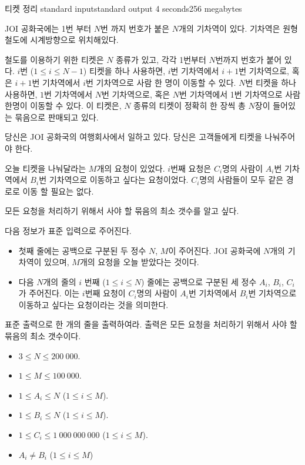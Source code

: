 \begin{problem}{티켓 정리}
	{standard input}{standard output}
	{4 seconds}{256 megabytes}{}
	
	JOI 공화국에는 1번 부터 $N$번 까지 번호가 붙은 $N$개의 기차역이 있다. 기차역은 원형 철도에 시계방향으로 위치해있다.
	
	철도를 이용하기 위한 티켓은 $N$ 종류가 있고, 각각 1번부터 $N$번까지 번호가 붙어 있다. $i$번 ($1 \le i \le N-1$) 티켓을 하나 사용하면, $i$번 기차역에서 $i+1$번 기차역으로, 혹은 $i+1$번 기차역에서 $i$번 기차역으로 사람 한 명이 이동할 수 있다. $N$번 티켓을 하나 사용하면, $1$번 기차역에서 $N$번 기차역으로, 혹은 $N$번 기차역에서 1번 기차역으로 사람 한명이 이동할 수 있다. 이 티켓은, $N$ 종류의 티켓이 정확히 한 장씩 총 $N$장이 들어있는 묶음으로 판매되고 있다.
	
	당신은 JOI 공화국의 여행회사에서 일하고 있다. 당신은 고객들에게 티켓을 나눠주어야 한다.
	
	오늘 티켓을 나눠달라는 $M$개의 요청이 있었다. $i$번째 요청은 $C_i$명의 사람이 $A_i$번 기차역에서 $B_i$번 기차역으로 이동하고 싶다는 요청이었다. $C_i$명의 사람들이 모두 같은 경로로 이동 할 필요는 없다.
	
	모든 요청을 처리하기 위해서 사야 할 묶음의 최소 갯수를 알고 싶다.

	\InputFile
	
	다음 정보가 표준 입력으로 주어진다.
	
	\begin{itemize}
		\item 첫째 줄에는 공백으로 구분된 두 정수 $N$, $M$이 주어진다. JOI 공화국에 $N$개의 기차역이 있으며, $M$개의 요청을 오늘 받았다는 것이다.
		\item 다음 $N$개의 줄의 $i$ 번째 ($1 \le i \le N$) 줄에는 공백으로 구분된 세 정수 $A_i$, $B_i$, $C_i$가 주어진다. 이는 $i$번째 요청이 $C_i$명의 사람이 $A_i$번 기차역에서 $B_i$번 기차역으로 이동하고 싶다는 요청이라는 것을 의미한다.
	\end{itemize}

	
	\OutputFile
	
	표준 출력으로 한 개의 줄을 출력하여라. 출력은 모든 요청을 처리하기 위해서 사야 할 묶음의 최소 갯수이다.
	
	\Constraints
	
	\begin{itemize}
	
	\item $3 \le N \le 200\ 000$.
	\item $1 \le M \le 100\ 000$.
	\item $1 \le A_i \le N$ ($1 \le i \le M$).
	\item $1 \le B_i \le N$ ($1 \le i \le M$).
	\item $1 \le C_i \le 1\ 000\ 000\ 000$ ($1 \le i \le M$).
	\item $A_i \ne B_i$ ($1 \le i \le M$)
	\end{itemize}
	

\end{problem}
